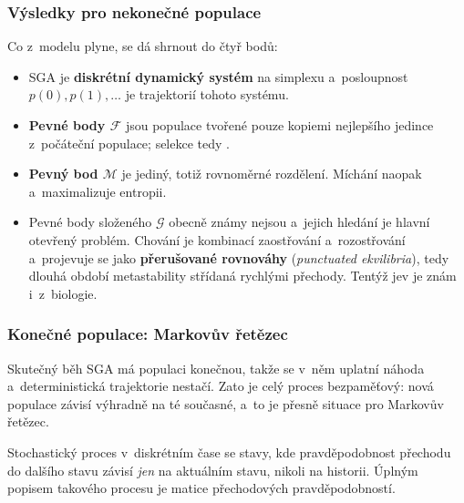 \documentclass[11pt,a4paper]{article}
\theoremstyle{definition}
\begin{document}
\subsubsection{Výsledky pro nekonečné populace}

Co z~modelu plyne, se dá shrnout do čtyř bodů:
\begin{itemize}
\item SGA je \textbf{diskrétní dynamický systém} na simplexu a~posloupnost
  $p(0), p(1), \dots$ je trajektorií tohoto systému.
\item \textbf{Pevné body $\mathcal{F}$} jsou populace tvořené pouze kopiemi
  nejlepšího jedince z~počáteční populace; selekce tedy .
\item \textbf{Pevný bod $\mathcal{M}$} je jediný, totiž rovnoměrné rozdělení.
  Míchání naopak  a~maximalizuje entropii.
\item Pevné body složeného $\mathcal{G}$ obecně známy nejsou a~jejich hledání
  je hlavní otevřený problém. Chování je kombinací zaostřování a~rozostřování
  a~projevuje se jako \textbf{přerušované rovnováhy}
  (\emph{punctuated ekvilibria}), tedy dlouhá období metastability střídaná
  rychlými přechody. Tentýž jev je znám i~z~biologie.
\end{itemize}

\subsubsection{Konečné populace: Markovův řetězec}

Skutečný běh SGA má populaci konečnou, takže se v~něm uplatní náhoda a~deterministická
trajektorie nestačí. Zato je celý proces bezpaměťový: nová populace závisí výhradně na té
současné, a~to je přesně situace pro Markovův řetězec.

\begin{defbox}
Stochastický proces v~diskrétním čase se stavy, kde pravděpodobnost přechodu
do dalšího stavu závisí \emph{jen} na aktuálním stavu, nikoli na historii.
Úplným popisem takového procesu je matice přechodových pravděpodobností.
\end{defbox}
\end{document}
